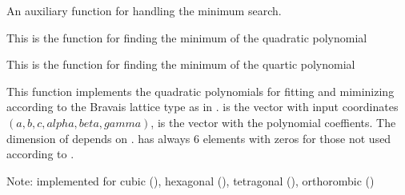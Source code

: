 \documentclass[letterpaper,10pt,english]{sphinxmanual}
\begin{document}

\begin{fulllineitems}
\label{pyqha:pyqha.minutils.find_min}
An auxiliary function for handling the minimum search.

\end{fulllineitems}


\begin{fulllineitems}
\label{pyqha:pyqha.minutils.find_min_quadratic}
This is the function for finding the minimum of the quadratic polynomial

\end{fulllineitems}


\begin{fulllineitems}
\label{pyqha:pyqha.minutils.find_min_quartic}
This is the function for finding the minimum of the quartic polynomial

\end{fulllineitems}


\begin{fulllineitems}
\label{pyqha:pyqha.minutils.fquadratic}
This function implements the quadratic polynomials for fitting and miminizing
according to the Bravais lattice type as in .
 is the vector with input coordinates \((a,b,c,alpha,beta,gamma)\),
 is the vector
with the polynomial coeffients. The dimension of  depends on
.  has always 6 elements with zeros for those not used according to
.

Note: implemented for cubic (), hexagonal (), 
tetragonal (), orthorombic ()

\end{fulllineitems}
\end{document}

